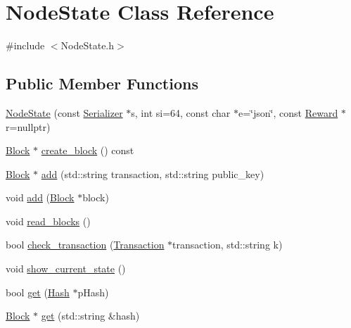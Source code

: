 \hypertarget{classNodeState}{}\section{Node\+State Class Reference}
\label{classNodeState}


{\ttfamily \#include $<$Node\+State.\+h$>$}

\subsection*{Public Member Functions}
\begin{DoxyCompactItemize}
\item 
\mbox{\hyperlink{classNodeState_acd97fc0d223a0037fb60228ef3a8d8fc}{Node\+State}} (const \mbox{\hyperlink{classSerializer}{Serializer}} $\ast$s, int si=64, const char $\ast$e=\char`\"{}json\char`\"{}, const \mbox{\hyperlink{classReward}{Reward}} $\ast$r=nullptr)
\item 
\mbox{\hyperlink{classBlock}{Block}} $\ast$ \mbox{\hyperlink{classNodeState_a132d657fd8413e9f7eb92237cc66b38c}{create\+\_\+block}} () const
\item 
\mbox{\hyperlink{classBlock}{Block}} $\ast$ \mbox{\hyperlink{classNodeState_a010b7e7cb6d050a2d78962e6532aea9d}{add}} (std\+::string transaction, std\+::string public\+\_\+key)
\item 
void \mbox{\hyperlink{classNodeState_a75e2e94448c4b5579b93b5c2fc0671b9}{add}} (\mbox{\hyperlink{classBlock}{Block}} $\ast$block)
\item 
void \mbox{\hyperlink{classNodeState_ae2e3a8a54ab5276bf469af2cf2107f2b}{read\+\_\+blocks}} ()
\item 
bool \mbox{\hyperlink{classNodeState_ad8fac1372753ec35c9fcee92f71d75d6}{check\+\_\+transaction}} (\mbox{\hyperlink{classTransaction}{Transaction}} $\ast$transaction, std\+::string k)
\item 
void \mbox{\hyperlink{classNodeState_aedd8b10b2ca3f51e5c95b7ebed70464c}{show\+\_\+current\+\_\+state}} ()
\item 
bool \mbox{\hyperlink{classNodeState_a771321e4b2c56515ffb79e57da71db30}{get}} (\mbox{\hyperlink{classHash}{Hash}} $\ast$p\+Hash)
\item 
\mbox{\hyperlink{classBlock}{Block}} $\ast$ \mbox{\hyperlink{classNodeState_a130cf13803990afc44bee6bed8dd4e05}{get}} (std\+::string \&hash)
\end{DoxyCompactItemize}


